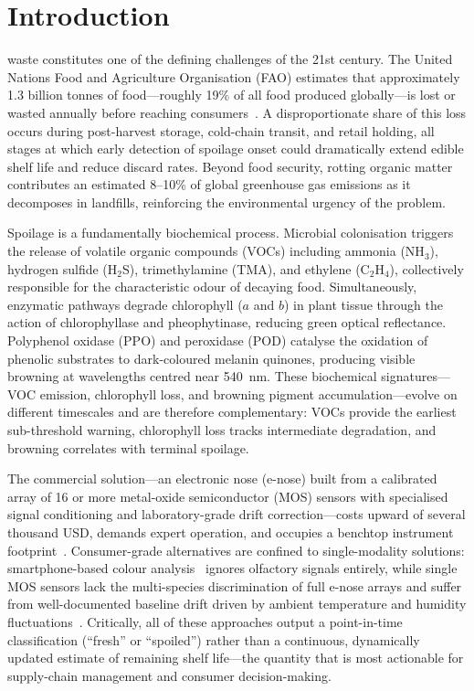 \documentclass{ieeeaccess}
\begin{document}
\titlepgskip=-21pt
\maketitle

\section{Introduction}
\label{sec:introduction}
 waste constitutes one of the defining challenges of the 21st century. The United Nations Food and Agriculture Organisation (FAO) estimates that approximately 1.3 billion tonnes of food---roughly 19\% of all food produced globally---is lost or wasted annually before reaching consumers~\cite{Davidescu2025}. A disproportionate share of this loss occurs during post-harvest storage, cold-chain transit, and retail holding, all stages at which early detection of spoilage onset could dramatically extend edible shelf life and reduce discard rates. Beyond food security, rotting organic matter contributes an estimated 8--10\% of global greenhouse gas emissions as it decomposes in landfills, reinforcing the environmental urgency of the problem.

Spoilage is a fundamentally biochemical process. Microbial colonisation triggers the release of volatile organic compounds (VOCs) including ammonia (NH$_3$), hydrogen sulfide (H$_2$S), trimethylamine (TMA), and ethylene (C$_2$H$_4$), collectively responsible for the characteristic odour of decaying food. Simultaneously, enzymatic pathways degrade chlorophyll ($a$ and $b$) in plant tissue through the action of chlorophyllase and pheophytinase, reducing green optical reflectance. Polyphenol oxidase (PPO) and peroxidase (POD) catalyse the oxidation of phenolic substrates to dark-coloured melanin quinones, producing visible browning at wavelengths centred near 540~nm. These biochemical signatures---VOC emission, chlorophyll loss, and browning pigment accumulation---evolve on different timescales and are therefore complementary: VOCs provide the earliest sub-threshold warning, chlorophyll loss tracks intermediate degradation, and browning correlates with terminal spoilage.

The commercial solution---an electronic nose (e-nose) built from a calibrated array of 16 or more metal-oxide semiconductor (MOS) sensors with specialised signal conditioning and laboratory-grade drift correction---costs upward of several thousand USD, demands expert operation, and occupies a benchtop instrument footprint~\cite{Vergara2012}. Consumer-grade alternatives are confined to single-modality solutions: smartphone-based colour analysis~\cite{Amin2023} ignores olfactory signals entirely, while single MOS sensors lack the multi-species discrimination of full e-nose arrays and suffer from well-documented baseline drift driven by ambient temperature and humidity fluctuations~\cite{Huerta2016}. Critically, all of these approaches output a point-in-time classification (``fresh'' or ``spoiled'') rather than a continuous, dynamically updated estimate of remaining shelf life---the quantity that is most actionable for supply-chain management and consumer decision-making.
\end{document}

